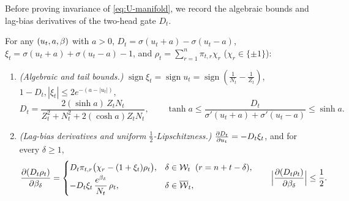 Before proving invariance of \cref{eq:U-manifold}, we record the algebraic bounds and lag-bias derivatives of the two-head gate $D_t$.

\begin{lemma}
\label{lem:gate-calculus}
For any $(u_t, a, \beta)$ with $a > 0$, $D_t = \sigma(u_t + a) - \sigma(u_t - a)$, $\xi_t = \sigma(u_t + a) + \sigma(u_t - a) - 1$, and $\rho_t = \sum_{r=1}^n \pi_{t,r}\chi_r$ ($\chi_r \in \{\pm 1\}$):
\begin{enumerate}[label=(\roman*),leftmargin=*,itemsep=1pt,topsep=2pt]
\item \emph{(Algebraic and tail bounds.)} $\operatorname{sign}\xi_t = \operatorname{sign}u_t = \operatorname{sign}(\frac{1}{N_t} - \frac{1}{Z_t})$, $1 - D_t, |\xi_t| \le 2e^{-(a - |u_t|)}$,
\begin{equation}
  D_t = \frac{2(\sinh a)\,Z_t N_t}{Z_t^2 + N_t^2 + 2(\cosh a)Z_t N_t}, \qquad
  \tanh a \le \frac{D_t}{\sigma'(u_t+a)+\sigma'(u_t-a)} \le \sinh a.
  \label{eq:U-rational}
\end{equation}
\item \emph{(Lag-bias derivatives and uniform $\frac{1}{2}$-Lipschitzness.)} $\pd{D_t}{u_t} = -D_t\xi_t$, and for every $\delta \ge 1$,
\[
  \pd{(D_t\rho_t)}{\brel_\delta} = \begin{cases}
    D_t\pi_{t,r}\bigl(\chi_r - (1 + \xi_t)\rho_t\bigr), & \delta \in \mathcal W_t \;\; (r = n + t - \delta),\\[2pt]
    -D_t\xi_t\,\dfrac{e^{\brel_\delta}}{N_t}\,\rho_t, & \delta \in \overline{\mathcal W}_t,
  \end{cases}
  \qquad
  \Bigl\lvert\pd{(D_t\rho_t)}{\brel_\delta}\Bigr\rvert \le \frac{1}{2}.
\]
\end{enumerate}
\end{lemma}

